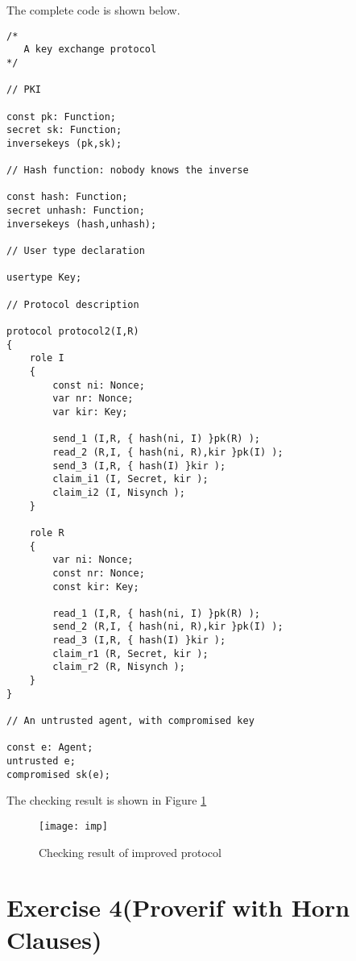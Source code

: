 \documentclass[a4paper, 12pt]{report}
\begin{document}
    The complete code is shown below.
    \begin{lstlisting}[frame=single]
/* 
   A key exchange protocol
*/

// PKI

const pk: Function;
secret sk: Function;
inversekeys (pk,sk);

// Hash function: nobody knows the inverse

const hash: Function;
secret unhash: Function;
inversekeys (hash,unhash);

// User type declaration

usertype Key;

// Protocol description

protocol protocol2(I,R)
{
	role I
	{
		const ni: Nonce;
		var nr: Nonce;
		var kir: Key;

		send_1 (I,R, { hash(ni, I) }pk(R) );
		read_2 (R,I, { hash(ni, R),kir }pk(I) );
		send_3 (I,R, { hash(I) }kir );
		claim_i1 (I, Secret, kir );
		claim_i2 (I, Nisynch );
	}

	role R
	{
		var ni: Nonce;
		const nr: Nonce;
		const kir: Key;

		read_1 (I,R, { hash(ni, I) }pk(R) );
		send_2 (R,I, { hash(ni, R),kir }pk(I) );
		read_3 (I,R, { hash(I) }kir );
		claim_r1 (R, Secret, kir );
		claim_r2 (R, Nisynch );
	}
}

// An untrusted agent, with compromised key

const e: Agent;
untrusted e;
compromised sk(e);
    \end{lstlisting}
    The checking result is shown in Figure \ref{imp}

    \begin{figure}[H]
        \centering
        \texttt{[image: imp]}
        \caption{Checking result of improved protocol}
        \label{imp}
    \end{figure}
\chapter* {Exercise 4(Proverif with Horn Clauses)}
%
\end{document}
